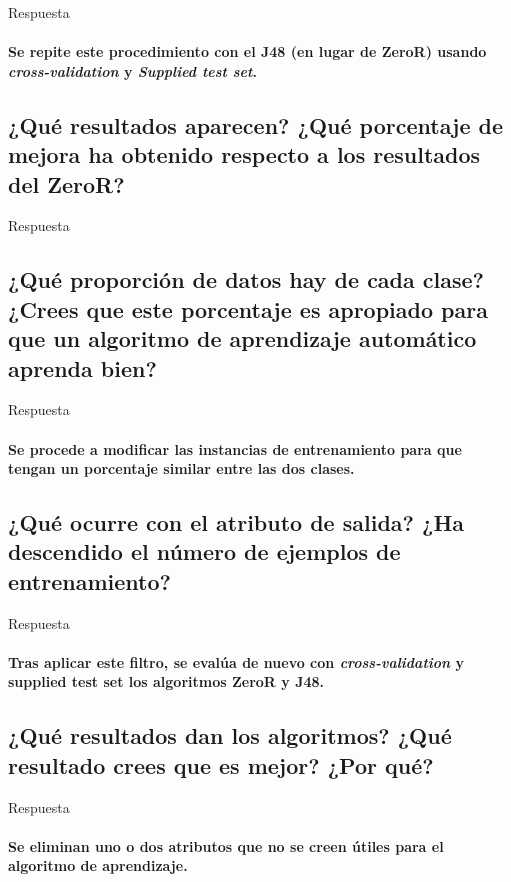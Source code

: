 \documentclass[12pt]{article}
\begin{document}
Respuesta

\paragraph{\small Se repite este procedimiento con el J48 (en lugar de ZeroR) usando
\emph{cross-validation} y \emph{Supplied test set}.}

\subsection{\small ¿Qué resultados aparecen? ¿Qué porcentaje de mejora ha obtenido
respecto a los resultados del ZeroR?}

Respuesta

\subsection{\small ¿Qué proporción de datos hay de cada clase? ¿Crees que este
porcentaje es apropiado para que un algoritmo de aprendizaje automático aprenda
bien?}

Respuesta

\paragraph{\small Se procede a modificar las instancias de entrenamiento para que
tengan un porcentaje similar entre las dos clases.}
\subsection{\small ¿Qué ocurre con el atributo de salida? ¿Ha descendido el número de
ejemplos de entrenamiento?}

Respuesta

\paragraph{\small Tras aplicar este filtro, se evalúa de nuevo con \emph{cross-validation}
 y supplied test set los algoritmos ZeroR y J48.}

\subsection{\small ¿Qué resultados dan los algoritmos? ¿Qué resultado crees que es
mejor? ¿Por qué?}

Respuesta

\paragraph{\small Se eliminan uno o dos atributos que no se creen útiles para el
algoritmo de aprendizaje.}
\end{document}
